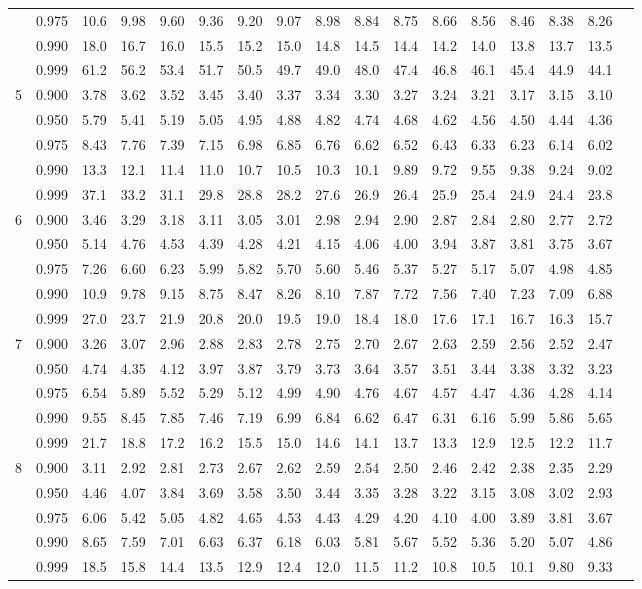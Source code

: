 \documentclass[pdftex,11pt,openany]{book}\usepackage[]{graphicx}\usepackage[]{color}
\begin{document}
{\begin{center}
\begin{tabular}{rrr@{\,}r@{\,}r@{\,}r@{\,}r@{\,}r@{\,}r@{\,}r
                   @{\,}r@{\,}r@{\,}r@{\,}r@{\,}r@{\,}r@{\,}r}
 &0.975&10.6&9.98&9.60&9.36&9.20&9.07&8.98&8.84&8.75&8.66&8.56&8.46&8.38&8.26\\
 &0.990&18.0&16.7&16.0&15.5&15.2&15.0&14.8&14.5&14.4&14.2&14.0&13.8&13.7&13.5\\
 &0.999&61.2&56.2&53.4&51.7&50.5&49.7&49.0&48.0&47.4&46.8&46.1&45.4&44.9&44.1\\
5&0.900&3.78&3.62&3.52&3.45&3.40&3.37&3.34&3.30&3.27&3.24&3.21&3.17&3.15&3.10\\
 &0.950&5.79&5.41&5.19&5.05&4.95&4.88&4.82&4.74&4.68&4.62&4.56&4.50&4.44&4.36\\
 &0.975&8.43&7.76&7.39&7.15&6.98&6.85&6.76&6.62&6.52&6.43&6.33&6.23&6.14&6.02\\
 &0.990&13.3&12.1&11.4&11.0&10.7&10.5&10.3&10.1&9.89&9.72&9.55&9.38&9.24&9.02\\
 &0.999&37.1&33.2&31.1&29.8&28.8&28.2&27.6&26.9&26.4&25.9&25.4&24.9&24.4&23.8\\
6&0.900&3.46&3.29&3.18&3.11&3.05&3.01&2.98&2.94&2.90&2.87&2.84&2.80&2.77&2.72\\
 &0.950&5.14&4.76&4.53&4.39&4.28&4.21&4.15&4.06&4.00&3.94&3.87&3.81&3.75&3.67\\
 &0.975&7.26&6.60&6.23&5.99&5.82&5.70&5.60&5.46&5.37&5.27&5.17&5.07&4.98&4.85\\
 &0.990&10.9&9.78&9.15&8.75&8.47&8.26&8.10&7.87&7.72&7.56&7.40&7.23&7.09&6.88\\
 &0.999&27.0&23.7&21.9&20.8&20.0&19.5&19.0&18.4&18.0&17.6&17.1&16.7&16.3&15.7\\
7&0.900&3.26&3.07&2.96&2.88&2.83&2.78&2.75&2.70&2.67&2.63&2.59&2.56&2.52&2.47\\
 &0.950&4.74&4.35&4.12&3.97&3.87&3.79&3.73&3.64&3.57&3.51&3.44&3.38&3.32&3.23\\
 &0.975&6.54&5.89&5.52&5.29&5.12&4.99&4.90&4.76&4.67&4.57&4.47&4.36&4.28&4.14\\
 &0.990&9.55&8.45&7.85&7.46&7.19&6.99&6.84&6.62&6.47&6.31&6.16&5.99&5.86&5.65\\
 &0.999&21.7&18.8&17.2&16.2&15.5&15.0&14.6&14.1&13.7&13.3&12.9&12.5&12.2&11.7\\
8&0.900&3.11&2.92&2.81&2.73&2.67&2.62&2.59&2.54&2.50&2.46&2.42&2.38&2.35&2.29\\
 &0.950&4.46&4.07&3.84&3.69&3.58&3.50&3.44&3.35&3.28&3.22&3.15&3.08&3.02&2.93\\
 &0.975&6.06&5.42&5.05&4.82&4.65&4.53&4.43&4.29&4.20&4.10&4.00&3.89&3.81&3.67\\
 &0.990&8.65&7.59&7.01&6.63&6.37&6.18&6.03&5.81&5.67&5.52&5.36&5.20&5.07&4.86\\
 &0.999&18.5&15.8&14.4&13.5&12.9&12.4&12.0&11.5&11.2&10.8&10.5&10.1&9.80&9.33
\end{tabular}
\end{center}

}
\end{document}
